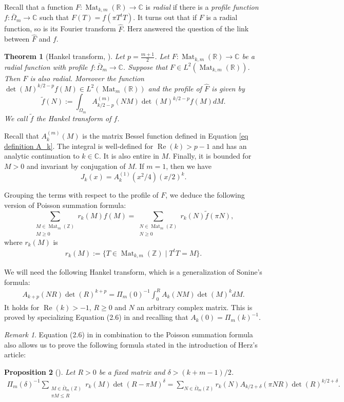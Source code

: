 \documentclass[oneside]{amsart}
\numberwithin{equation}{section}
\newtheorem{theorem}{Theorem}[section]
\newtheorem{proposition}[theorem]{Proposition}
\theoremstyle{definition}
\theoremstyle{remark}
\newtheorem*{remark}{Remark}
\theoremstyle{remark}
\renewcommand{\Re}{\operatorname{Re}}
\newcommand{\CC}{\mathbb C}								%
\newcommand{\RR}{\mathbb R}
\newcommand{\ZZ}{\mathbb Z}
\DeclareMathOperator{\Mat}{Mat}
\begin{document}
Recall that a function $F:\Mat_{k,m}(\RR)\to\CC$ is \emph{radial} if there is a \emph{profile function} $f:\bar\Omega_m\to\CC$ such that $F(T)=f(\pi T^tT)$. It turns out that if $F$ is a radial function, so is its Fourier transform $\hat F$. Herz answered the question of the link between $\hat F$ and $f$.

\begin{theorem}[{Hankel transform, \cite[Theorem 3.4]{Her55}}]\label{thm Hankel transform}
Let $p=\frac{m+1}2$. Let $F:\Mat_{k,m}(\RR)\to\CC$ be a radial function with profile $f:\bar\Omega_m\to\CC$. Suppose that $F\in L^2(\Mat_{k,m}(\RR))$. Then $\hat F$ is also radial. Moreover the function $\det(M)^{k/2-p}f(M)\in L^2(\Mat_m(\RR))$ and the profile of $\hat F$ is given by
$$\tilde f(N):=\int_{\Omega_m}A_{k/2-p}^{(m)}(NM)\det(M)^{k/2-p}f(M)dM.$$
We call $\tilde f$ the \emph{Hankel transform} of $f$.
\end{theorem}

Recall that $A_k^{(m)}(M)$ is the matrix Bessel function defined in Equation \eqref{eq definition A_k}. The integral is well-defined for $\Re(k)>p-1$ and has an analytic continuation to $k\in\CC$. It is also entire in $M$. Finally, it is bounded for $M>0$ and invariant by conjugation of $M$. If $m=1$, then we have
$$J_k(x)=A_k^{(1)}(x^2/4)(x/2)^k.$$

Grouping the terms with respect to the profile of $F$, we deduce the following version of Poisson summation formula:
$$\sum_{\substack{M\in\Mat_m(\ZZ)\\M\geq0}}r_k(M)f(M)=\sum_{\substack{N\in\Mat_m(\ZZ)\\N\geq0}}r_k(N)\tilde f(\pi N),$$
where $r_k(M)$ is
\begin{align}\label{eq definition r_k(M)}
r_k(M):=\{T\in\Mat_{k,m}(\ZZ)\mid T^tT=M\}.
\end{align}

We will need the following Hankel transform, which is a generalization of Sonine's formula:
\begin{align}\label{eq Sonine formula}
A_{k+p}(NR)\det(R)^{k+p}=\Pi_m(0)^{-1}\int_0^RA_k(NM)\det(M)^kdM.
\end{align}
It holds for $\Re(k)>-1$, $R\geq0$ and $N$ an arbitrary complex matrix. This is proved by specializing Equation (2.6) in \cite{Her55} and recalling that $A_k(0)=\Pi_m(k)^{-1}$.

\begin{remark}
Equation (2.6) in \cite{Her55} in combination to the Poisson summation formula also allows us to prove the following formula stated in the introduction of Herz's article:
\begin{proposition}[{\cite[p.476]{Her55}}]
Let $R>0$ be a fixed matrix and $\delta>(k+m-1)/2$.
\begin{align}\label{eq Poisson summation}
\Pi_m(\delta)^{-1}\sum_{\substack{M\in\bar\Omega_m(\ZZ)\\\pi M\leq R}}r_k(M)\det(R-\pi M)^\delta=\sum_{N\in\bar\Omega_m(\ZZ)}r_k(N)A_{k/2+\delta}(\pi NR)\det(R)^{k/2+\delta}.
\end{align}
\end{proposition}
\end{remark}
\end{document}

